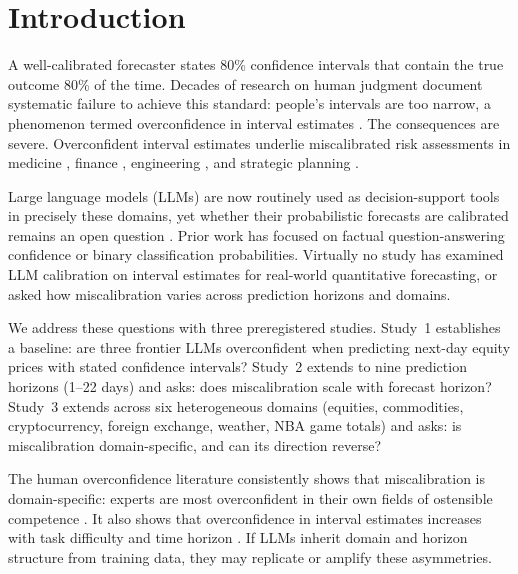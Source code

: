 
\section{Introduction}

A well-calibrated forecaster states 80\% confidence intervals that contain
the true outcome 80\% of the time. Decades of research on human judgment
document systematic failure to achieve this standard: people's intervals are
too narrow, a phenomenon termed overconfidence in interval estimates
\citep{Alpert1982, Lichtenstein1982, Klayman1999, Soll2004}. The consequences
are severe. Overconfident interval estimates underlie miscalibrated risk
assessments in medicine \citep{ChristensenSzalanski1981}, finance
\citep{BenDavid2013}, engineering \citep{Flyvbjerg2002}, and strategic
planning \citep{Lovallo2003}.

Large language models (LLMs) are now routinely used as decision-support tools
in precisely these domains, yet whether their probabilistic forecasts are
calibrated remains an open question \citep{Kadavath2022, Lin2022, Xiong2024}.
Prior work has focused on factual question-answering confidence or binary
classification probabilities. Virtually no study has examined LLM calibration
on interval estimates for real-world quantitative forecasting, or asked how
miscalibration varies across prediction horizons and domains.

We address these questions with three preregistered studies. Study~1
establishes a baseline: are three frontier LLMs overconfident when predicting
next-day equity prices with stated confidence intervals? Study~2 extends to
nine prediction horizons (1--22 days) and asks: does miscalibration scale
with forecast horizon? Study~3 extends across six heterogeneous domains
(equities, commodities, cryptocurrency, foreign exchange, weather, NBA game
totals) and asks: is miscalibration domain-specific, and can its direction
reverse?

The human overconfidence literature consistently shows that miscalibration
is domain-specific: experts are most overconfident in their own fields of
ostensible competence \citep{Klayman1999, Soll2004}. It also shows that
overconfidence in interval estimates increases with task difficulty and
time horizon \citep{Griffin1992}. If LLMs inherit domain and horizon
structure from training data, they may replicate or amplify these asymmetries.


